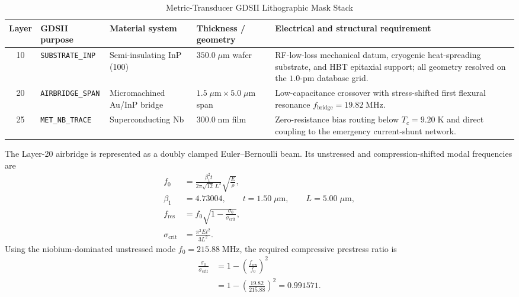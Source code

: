 \documentclass[10pt,twocolumn]{IEEEtran}
\begin{document}
\begin{table}[t]
\caption{Metric-Transducer GDSII Lithographic Mask Stack}
\label{tab:gds_section3}
\centering
\footnotesize
\begin{tabular}{@{}clllp{6.0cm}@{}}
\toprule
Layer & GDSII purpose & Material system & Thickness / geometry & Electrical and structural requirement \\
\midrule
10 & \texttt{SUBSTRATE\_INP} & Semi-insulating InP (100) & $350.0\;\mu\mathrm{m}$ wafer & RF-low-loss mechanical datum, cryogenic heat-spreading substrate, and HBT epitaxial support; all geometry resolved on the $1.0$-pm database grid. \\
20 & \texttt{AIRBRIDGE\_SPAN} & Micromachined Au/InP bridge & $1.5\;\mu\mathrm{m}\times5.0\;\mu\mathrm{m}$ span & Low-capacitance crossover with stress-shifted first flexural resonance $f_{\mathrm{bridge}}=19.82\;\mathrm{MHz}$. \\
25 & \texttt{MET\_NB\_TRACE} & Superconducting Nb & $300.0\;\mathrm{nm}$ film & Zero-resistance bias routing below $T_c=9.20\;\mathrm{K}$ and direct coupling to the emergency current-shunt network. \\
\bottomrule
\end{tabular}
\end{table}

The Layer-20 airbridge is represented as a doubly clamped Euler--Bernoulli beam. Its unstressed and compression-shifted modal frequencies are
\begin{equation}
\begin{aligned}
f_0&=\frac{\beta_1^2t}{2\pi\sqrt{12}\,L^2}
\sqrt{\frac{E}{\rho}}, \\
\beta_1&=4.73004,\qquad
t=1.50\;\mu\mathrm{m},\qquad L=5.00\;\mu\mathrm{m}, \\
f_{\mathrm{res}}&=f_0
\sqrt{1-\frac{\sigma_0}{\sigma_{\mathrm{crit}}}}, \\
\sigma_{\mathrm{crit}}&=\frac{\pi^2Et^2}{3L^2}.
\end{aligned}
\label{eq:airbridge_resonance}
\end{equation}
Using the niobium-dominated unstressed mode $f_0=215.88\;\mathrm{MHz}$, the required compressive prestress ratio is
\begin{equation}
\begin{aligned}
\frac{\sigma_0}{\sigma_{\mathrm{crit}}}
&=1-\left(\frac{f_{\mathrm{res}}}{f_0}\right)^2 \\
&=1-\left(\frac{19.82}{215.88}\right)^2
=0.991571.
\end{aligned}
\label{eq:airbridge_prestress}
\end{equation}
\end{document}
